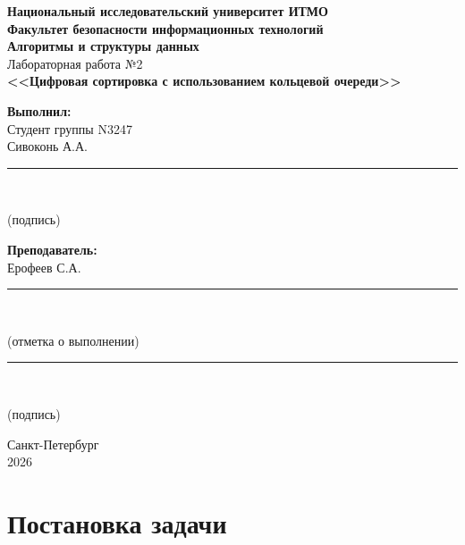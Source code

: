 \documentclass[a4paper,14pt]{extarticle}
\begin{document}
\begin{titlepage}
\begin{center}

\textbf{Национальный исследовательский университет ИТМО}\\[0.5cm]
\textbf{Факультет безопасности информационных технологий}\\[2cm]

{\Large\textbf{Алгоритмы и структуры данных}}\\[1cm]
{\large Лабораторная работа №2}\\[0.5cm]
{\large\textbf{<<Цифровая сортировка с использованием кольцевой очереди>>}}\\[3cm]

\begin{flushright}
\begin{minipage}{0.45\textwidth}
\textbf{Выполнил:}\\
Студент группы N3247\\
Сивоконь А.А.\\[1cm]

\noindent\rule{6cm}{0.4pt}\\
\centerline{(подпись)}

\vspace{0.5cm}

\textbf{Преподаватель:}\\
Ерофеев С.А.\\[1cm]
\noindent\rule{6cm}{0.4pt}\\
\centerline{(отметка о выполнении)}

\vspace{1.5cm}

\noindent\rule{6cm}{0.4pt}\\
\centerline{(подпись)}
\end{minipage}
\end{flushright}

\vfill

Санкт-Петербург\\
2026

\end{center}
\end{titlepage}

\newpage
\renewcommand{\contentsname}{Содержание}
\tableofcontents

\newpage
\section{Постановка задачи}
\end{document}

